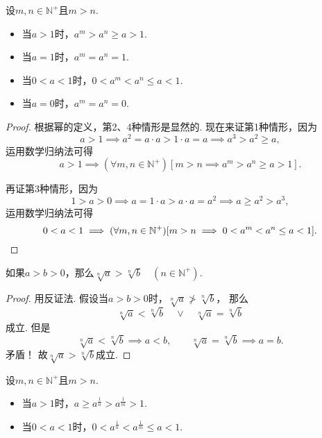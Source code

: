 \begin{corollary}\label{theorem:不等式.正整数次幂的序}
设\(m,n\in\mathbb{N}^+\)且\(m>n\).
\begin{itemize}
	\item 当\(a>1\)时，\(a^m > a^n \geq a > 1\).
	\item 当\(a=1\)时，\(a^m = a^n = 1\).
	\item 当\(0<a<1\)时，\(0 < a^m < a^n \leq a < 1\).
	\item 当\(a=0\)时，\(a^m = a^n = 0\).
\end{itemize}
\begin{proof}
根据幂的定义，第2、4种情形是显然的.
现在来证第1种情形，因为\[
	a > 1
	\implies
	a^2 = a \cdot a > 1 \cdot a = a
	\implies
	a^3 > a^2 \geq a,
\]
运用数学归纳法可得\[
	a>1
	\implies
	(\forall m,n\in\mathbb{N}^+)
	[m>n \implies a^m > a^n \geq a > 1].
\]

再证第3种情形，因为\[
	1>a>0
	\implies
	a = 1 \cdot a > a \cdot a = a^2
	\implies
	a \geq a^2 > a^3,
\]
运用数学归纳法可得\[
	0<a<1
	\implies
	(\forall m,n\in\mathbb{N}^+)
	[m>n \implies 0 < a^m < a^n \leq a < 1].
	\qedhere
\]
\end{proof}
\end{corollary}

\begin{theorem}
如果\(a>b>0\)，那么\(\sqrt[n]{a} > \sqrt[n]{b} \quad (n\in\mathbb{N}^+)\).
\begin{proof}
用反证法.
假设当\(a>b>0\)时，\(\sqrt[n]{a} \ngtr \sqrt[n]{b}\)，
那么\[
	\sqrt[n]{a} < \sqrt[n]{b}
	\quad\lor\quad
	\sqrt[n]{a} = \sqrt[n]{b}
\]成立.
但是\[
	\sqrt[n]{a} < \sqrt[n]{b} \implies a<b,
	\qquad
	\sqrt[n]{a} = \sqrt[n]{b} \implies a=b.
\]矛盾！
故\(\sqrt[n]{a}>\sqrt[n]{b}\)成立.
\end{proof}
\end{theorem}

\begin{theorem}
设\(m,n\in\mathbb{N}^+\)且\(m>n\).
\begin{itemize}
	\item 当\(a>1\)时，\(a \geq a^{\frac1n} > a^{\frac1m} > 1\).
	\item 当\(0<a<1\)时，\(0 < a^{\frac1n} < a^{\frac1m} \leq a < 1\).
\end{itemize}
\end{theorem}

